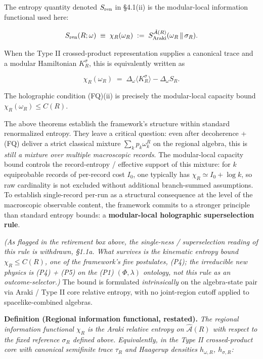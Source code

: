 \documentclass[11pt,a4paper]{article}
\begin{document}
The entropy quantity denoted $S_{\rm ren}$ in §4.1(ii) is the modular-local information functional used here:

\[
S_{\rm ren}(R; \omega) \;\equiv\; \chi_R(\omega_R) \;:=\; S^{\hat{\mathcal{A}}(R)}_{\rm Araki}(\omega_R \,\|\, \sigma_R).
\]

When the Type II crossed-product representation supplies a canonical trace and a modular Hamiltonian $K_R^\sigma$, this is equivalently written as

\[
\chi_R(\omega_R) \;=\; \Delta_\omega \langle K_R^\sigma \rangle - \Delta_\omega S_R.
\]

The holographic condition (FQ)(ii) is precisely the modular-local capacity bound $\chi_R(\omega_R) \le C(R)$.

The above theorems establish the framework's structure within standard renormalized entropy. They leave a critical question: even after decoherence + (FQ) deliver a strict classical mixture $\sum_k p_k \omega_k^R$ on the regional algebra, this is \emph{still a mixture over multiple macroscopic records}. The modular-local capacity bound controls the record-entropy / effective support of this mixture: for $k$ equiprobable records of per-record cost $I_0$, one typically has $\chi_R \simeq I_0 + \log k$, so raw cardinality is not excluded without additional branch-summed assumptions. To establish single-record per-run as a structural consequence at the level of the macroscopic observable content, the framework commits to a stronger principle than standard entropy bounds: a \textbf{modular-local holographic superselection rule}.

\emph{(As flagged in the retirement box above, the single-ness / superselection reading of this rule is withdrawn, §1.1a. What survives is the kinematic entropy bound $\chi_R \le C(R)$, one of the framework's five postulates, (P4); the irreducible new physics is (P4) + (P5) on the (P1) $(\Phi,\lambda)$ ontology, not this rule as an outcome-selector.)} The bound is formulated \emph{intrinsically} on the algebra-state pair via Araki / Type II core relative entropy, with no joint-region cutoff applied to spacelike-combined algebras.

\textbf{Definition (Regional information functional, restated).} \emph{The regional information functional $\chi_R$ is the Araki relative entropy on $\hat{\mathcal{A}}(R)$ with respect to the fixed reference $\sigma_R$ defined above. Equivalently, in the Type II crossed-product core with canonical semifinite trace $\tau_R$ and Haagerup densities $h_{\omega, R}$, $h_{\sigma, R}$:}
\end{document}
